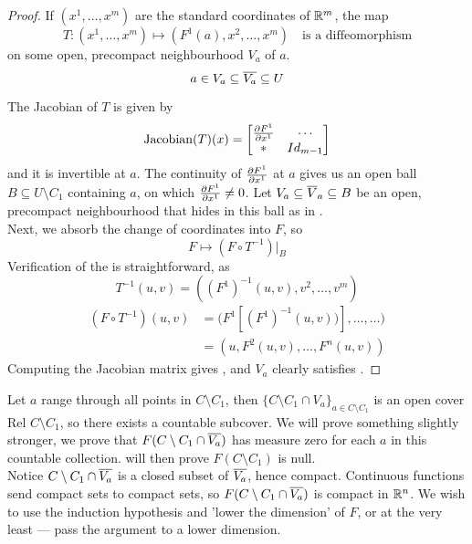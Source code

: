 \documentclass[../main-manifolds.tex]{subfiles}
\begin{document}
\begin{proof}
If $(x^1,\ldots,x^m)$ are the standard coordinates of ${\mathbb{R}^m}$, the map 
    \[
        T: (x^1,\ldots,x^m)\mapsto (F^1(a),x^2,\ldots,x^m)\quad\text{is a diffeomorphism}
    \]
    on some open, precompact neighbourhood $V_a$ of $a$.
    \[
        a\in V_a\subseteq \overline{V_a}\subseteq U
    \]
    
    The Jacobian of $T$ is given by
    \[
        \operatorname{Jacobian}(T)(x)=\begin{bmatrix}
            \pdv{F^1}{x^1}(x) & \cdots \\ * & Id_{m-1}
        \end{bmatrix}
    \]
    and it is invertible at $a$. The continuity of $\pdv{F^1}{x^1}$ at $a$ gives us an open ball $B\subseteq U\setminus C_1$ containing $a$, on which $\pdv{F^1}{x^1}\neq 0$. Let $V_a\subseteq\overline{V}_a\subseteq B$ be an open, precompact neighbourhood that hides in this ball as in . \\

    Next, we absorb the change of coordinates into $F$, so
    \[
        F\mapsto (F\circ T^{-1})|_{B}
    \]
    Verification of the  is straightforward, as
    \[
    T^{-1}(u,v) = ((F^1)^{-1}(u,v), v^2,\ldots,v^m)
    \]
    \begin{align*}
        (F\circ T^{-1})(u,v) 
        &= \biggl(F^1[(F^1)^{-1}(u,v))], \ldots,\ldots\biggr)\\
        &= (u, F^2(u,v),\ldots, F^n(u,v))
    \end{align*}
    Computing the Jacobian matrix gives , and $V_a$ clearly satisfies .
\end{proof}

Let $a$ range through all points in $C\setminus C_1$, then $\{C\setminus C_1\cap V_a\}_{a\in C\setminus C_1}$ is an open cover Rel $C\setminus C_1$, so there exists a countable subcover. We will prove something slightly stronger, we prove that $F(C\setminus C_1\cap \overline{V_a})$ has measure zero for each $a$ in this countable collection.  will then prove $F(C\setminus C_1)$ is null.\\

Notice $C\setminus C_1\cap \overline{V_a}$ is a closed subset of $\overline{V_a}$, hence compact. Continuous functions send compact sets to compact sets, so $F(C\setminus C_1\cap \overline{V_a})$ is compact in ${\mathbb{R}^n}$. We wish to use the induction hypothesis and 'lower the dimension' of $F$, or at the very least — pass the argument to a lower dimension.
\end{document}
